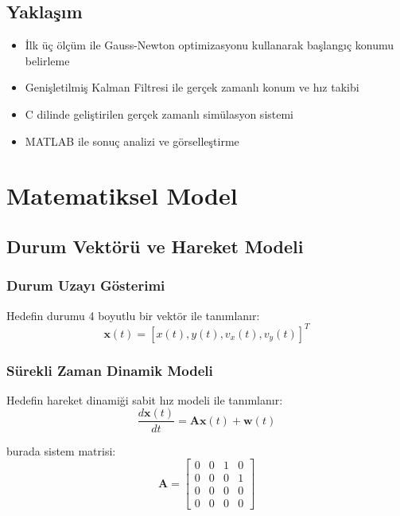 \documentclass[12pt,a4paper]{article}
\begin{document}
\subsection{Yakla\c{s}{\i}m}
\begin{itemize}
    \item İlk üç ölçüm ile Gauss-Newton optimizasyonu kullanarak başlangıç konumu belirleme
    \item Genişletilmiş Kalman Filtresi ile gerçek zamanlı konum ve hız takibi
    \item C dilinde geliştirilen gerçek zamanlı simülasyon sistemi
    \item MATLAB ile sonuç analizi ve görselleştirme
\end{itemize}

\section{Matematiksel Model}

\subsection{Durum Vektörü ve Hareket Modeli}

\subsubsection{Durum Uzayı Gösterimi}
Hedefin durumu 4 boyutlu bir vektör ile tanımlanır:
\begin{equation}
\mathbf{x}(t) = [x(t), y(t), v_x(t), v_y(t)]^T
\end{equation}

\subsubsection{Sürekli Zaman Dinamik Modeli}
Hedefin hareket dinamiği sabit hız modeli ile tanımlanır:
\begin{equation}
\frac{d\mathbf{x}(t)}{dt} = \mathbf{A}\mathbf{x}(t) + \mathbf{w}(t)
\end{equation}

burada sistem matrisi:
\begin{equation}
\mathbf{A} = \begin{bmatrix}
0 & 0 & 1 & 0 \\
0 & 0 & 0 & 1 \\
0 & 0 & 0 & 0 \\
0 & 0 & 0 & 0
\end{bmatrix}
\end{equation}
\end{document}
